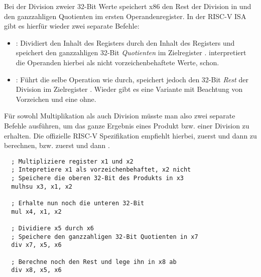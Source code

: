 Bei der Division zweier 32-Bit Werte speichert x86 den Rest der Division in
 und den ganzzahligen Quotienten im ersten Operandenregister. In der
RISC-V ISA gibt es hierfür wieder zwei separate Befehle:

\begin{itemize}
\item {}: Dividiert den Inhalt des Registers 
  durch den Inhalt des Registers  und speichert den ganzzahligen 32-Bit
  \emph{Quotienten} im Zielregister .  interpretiert die
  Operanden hierbei als nicht vorzeichenbehaftete Werte,  schon.
  \item {}: Führt die selbe Operation wie 
    durch, speichert jedoch den 32-Bit \emph{Rest} der Division im Zielregister
    . Wieder gibt es eine Variante mit Beachtung von Vorzeichen und
    eine ohne.
\end{itemize}

Für sowohl Multiplikation als auch Division müsste man also zwei separate
Befehle ausführen, um das ganze Ergebnis eines Produkt bzw. einer Division zu
erhalten. Die offizielle RISC-V Spezifikation empfiehlt hierbei, zuerst
 und dann  zu berechnen, bzw. zuerst 
und dann .

\begin{lstlisting}
  ; Multipliziere register x1 und x2
  ; Intepretiere x1 als vorzeichenbehaftet, x2 nicht
  ; Speichere die oberen 32-Bit des Produkts in x3
  mulhsu x3, x1, x2

  ; Erhalte nun noch die unteren 32-Bit
  mul x4, x1, x2

  ; Dividiere x5 durch x6
  ; Speichere den ganzzahligen 32-Bit Quotienten in x7
  div x7, x5, x6

  ; Berechne noch den Rest und lege ihn in x8 ab
  div x8, x5, x6
\end{lstlisting}